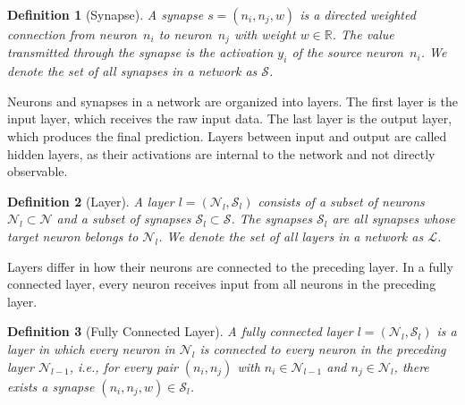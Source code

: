 \documentclass[
12pt,
fancyheadings,
a4paper,
twoside,
BCOR=0.7cm,
nobcorignoretitle,
grayscalebody,
]{stsreprt}
\newtheorem{definition}{Definition}[chapter]
\begin{document}
\begin{definition}[Synapse]
\label{def:synapse}
A synapse $s = (n_i, n_j, w)$ is a directed weighted connection from neuron~$n_i$ to neuron~$n_j$
with weight $w \in \mathbb{R}$.
The value transmitted through the synapse is the activation $y_i$ of the source neuron~$n_i$.
We denote the set of all synapses in a network as $\mathcal{S}$.
\end{definition}

Neurons and synapses in a network are organized into layers.
The first layer is the input layer, which receives the raw input data.
The last layer is the output layer, which produces the final prediction.
Layers between input and output are called hidden layers, as their activations are internal to the
network and not directly observable.

\begin{definition}[Layer]
\label{def:layer}
A layer $l = (\mathcal{N}_l, \mathcal{S}_l)$ consists of a subset of neurons $\mathcal{N}_l \subset
\mathcal{N}$ and a subset of synapses $\mathcal{S}_l \subset \mathcal{S}$. The synapses
$\mathcal{S}_l$ are all synapses whose target neuron belongs to $\mathcal{N}_l$.
We denote the set of all layers in a network as $\mathcal{L}$.
\end{definition}

Layers differ in how their neurons are connected to the preceding layer.
In a fully connected layer, every neuron receives input from all neurons in the preceding layer.

\begin{definition}[Fully Connected Layer]
\label{def:fc_layer}
A fully connected layer $l = (\mathcal{N}_l, \mathcal{S}_l)$ is a layer in which every neuron in
$\mathcal{N}_l$ is connected to every neuron in the preceding layer $\mathcal{N}_{l-1}$, i.e., for
every pair $(n_i, n_j)$ with $n_i \in \mathcal{N}_{l-1}$ and $n_j \in \mathcal{N}_l$, there exists
a synapse $(n_i, n_j, w) \in \mathcal{S}_l$.
\end{definition}
\end{document}
